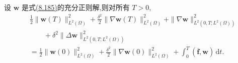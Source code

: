 \begin{lemma}
\label{lem:les-adm-zero-order-stability}
设 $\bm{w}$ 是式\hyperref[eq:les-adm-lowest-order-weak-form]{(8.185)}的充分正则解,则对所有 $T>0$,
\begin{equation}\label{eq:les-adm-zero-order-energy-equality}
\begin{aligned}
 &\frac12\|\bm{w}(T)\|_{L^2(\Omega)}^2
  +\frac{\delta^2}{2}
    \|\nabla\bm{w}(T)\|_{L^2(\Omega)}^2
  +\|\nabla\bm{w}\|_{L^2(0,T;L^2(\Omega))}^2\\
 &\qquad+\delta^2
    \|\Delta\bm{w}\|_{L^2(0,T;L^2(\Omega))}^2\\
 &=\frac12\|\bm{w}(0)\|_{L^2(\Omega)}^2
  +\frac{\delta^2}{2}
    \|\nabla\bm{w}(0)\|_{L^2(\Omega)}^2
  +\int_0^T(\overline{\bm{f}},\bm{w})\,\mathrm{d}t.
\end{aligned}
\end{equation}
\end{lemma}
